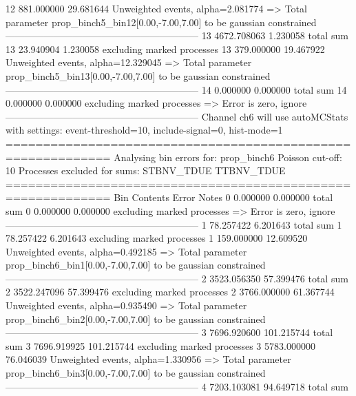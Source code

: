 12         881.000000      29.681644       Unweighted events, alpha=2.081774
  => Total parameter prop_binch5_bin12[0.00,-7.00,7.00] to be gaussian constrained
------------------------------------------------------------
13         4672.708063     1.230058        total sum                     
13         23.940904       1.230058        excluding marked processes    
13         379.000000      19.467922       Unweighted events, alpha=12.329045
  => Total parameter prop_binch5_bin13[0.00,-7.00,7.00] to be gaussian constrained
------------------------------------------------------------
14         0.000000        0.000000        total sum                     
14         0.000000        0.000000        excluding marked processes    
  => Error is zero, ignore      
------------------------------------------------------------
Channel ch6 will use autoMCStats with settings: event-threshold=10, include-signal=0, hist-mode=1
============================================================
Analysing bin errors for: prop_binch6
Poisson cut-off: 10
Processes excluded for sums: STBNV_TDUE TTBNV_TDUE
============================================================
Bin        Contents        Error           Notes                         
0          0.000000        0.000000        total sum                     
0          0.000000        0.000000        excluding marked processes    
  => Error is zero, ignore      
------------------------------------------------------------
1          78.257422       6.201643        total sum                     
1          78.257422       6.201643        excluding marked processes    
1          159.000000      12.609520       Unweighted events, alpha=0.492185
  => Total parameter prop_binch6_bin1[0.00,-7.00,7.00] to be gaussian constrained
------------------------------------------------------------
2          3523.056350     57.399476       total sum                     
2          3522.247096     57.399476       excluding marked processes    
2          3766.000000     61.367744       Unweighted events, alpha=0.935490
  => Total parameter prop_binch6_bin2[0.00,-7.00,7.00] to be gaussian constrained
------------------------------------------------------------
3          7696.920600     101.215744      total sum                     
3          7696.919925     101.215744      excluding marked processes    
3          5783.000000     76.046039       Unweighted events, alpha=1.330956
  => Total parameter prop_binch6_bin3[0.00,-7.00,7.00] to be gaussian constrained
------------------------------------------------------------
4          7203.103081     94.649718       total sum                     
